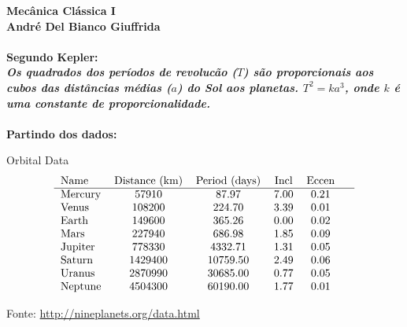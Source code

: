 \documentclass[a4paper,12pt]{exam}
\begin{document}
	\begingroup 
	  \bf \Large Mecânica Clássica I\\
	  \indent \normalsize André Del Bianco Giuffrida
	\endgroup
	\\ \quad
	\\
	Segundo Kepler: \\
	\textit{ Os quadrados dos períodos de revolucão ($T$) são proporcionais aos cubos das distâncias médias ($a$) do Sol aos planetas. $T^2=ka^3$, onde $k$ é uma constante de proporcionalidade.}\\
	\\
	Partindo dos dados:
	
	\begin {table}[h]
	Orbital Data
	\centering
		\[
		\begin{tabular}[c]{l*{9}{c}r}
			Name & Distance (km) & Period (days) & Incl & Eccen\\
			\hline
			Mercury &     57910   & 87.97    & 7.00  & 0.21 & \\
			Venus   &     108200  & 224.70   & 3.39  & 0.01 & \\
			Earth   &     149600  & 365.26   & 0.00  & 0.02 & \\
			Mars    &     227940  & 686.98   & 1.85  & 0.09 & \\
			Jupiter &     778330  & 4332.71  & 1.31  & 0.05 & \\
			Saturn  &     1429400 & 10759.50 & 2.49  & 0.06 & \\
			Uranus  &     2870990 & 30685.00 & 0.77  & 0.05 & \\
			Neptune &     4504300 & 60190.00 & 1.77  & 0.01 & \\
		\end{tabular}
		\]
	\caption{Fonte: \href{http://nineplanets.org/data.html}{http://nineplanets.org/data.html}}
	\end{table}
		
\end{document}
